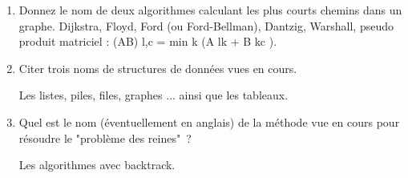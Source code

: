\documentclass[11pt]{article}
\begin{document}
\begin{enumerate}
\item   Donnez le nom de deux algorithmes calculant les plus courts chemins dans un graphe.
Dijkstra, Floyd, Ford (ou Ford-Bellman), Dantzig,
Warshall, pseudo produit matriciel : (AB) l,c = min k (A lk + B kc ).

\item   Citer trois noms de structures de données vues en cours.

Les listes, piles, files, graphes ... ainsi que les tableaux.

\item Quel est le nom (éventuellement en anglais) de la méthode vue en cours pour résoudre le "problème des reines"~? 

Les algorithmes avec backtrack.
\end{enumerate}
\end{document}
